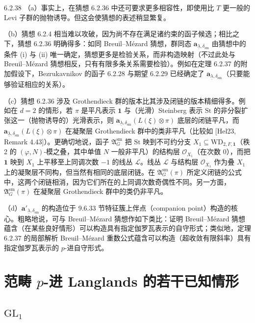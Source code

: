 \begin{rem}{6.2.38}\label{rem:a4-6-2-38}
（a）事实上，在猜想 6.2.36 中还可要求更多相容性，即使用比 $T$ 更一般的 Levi 子群的抛物诱导。但这会使猜想的表述稍显繁复。

（b）猜想 6.2.4 相当难以攻破，因为尚不存在满足诸约束的函子候选；相比之下，猜想 6.2.36 明确得多：如同 Breuil--Mézard 猜想，群同态 $\mathbf a_{\underline\lambda,\delta_{\mathrm{sm}}}$ 由猜想中的条件 (i) 与 (ii) 唯一确定，猜想更多是检验关系，而非构造映射（不过此处与 Breuil--Mézard 猜想相反，只有有限多条关系需要检验）。例如在定理 6.2.37 的附加假设下，Bezrukavnikov 的函子 6.2.28 与期望 6.2.29 已经确定了 $\mathbf a_{\underline\lambda,\delta_{\mathrm{sm}}}$（只要能够验证相应的关系）。

（c）猜想 6.2.36 涉及 Grothendieck 群的版本比其涉及闭链的版本精细得多。例如在 $d=2$ 的情形，若 $\pi$ 是平凡表示 $\mathbf 1$ 与（光滑）Steinberg 表示 $\mathrm{St}$ 的非分裂扩张这一（抛物诱导的）光滑表示，则 $\mathbf a_{\underline\lambda,\delta_{\mathrm{sm}}}(L(\xi)\otimes\pi)$ 底层的闭链平凡，而 $\mathbf a_{\underline\lambda,\delta_{\mathrm{sm}}}(L(\xi)\otimes\pi)$ 在凝聚层 Grothendieck 群中的类非平凡（比较如 [Hel23, Remark 4.43]）。更确切地说，函子 $\mathfrak A_G^{\mathrm{sm}}$ 把 $\mathrm{St}$ 映到不可约分支 $X_1\subseteq\mathrm{WD}_{2,F,\mathbf 1}$（秩 2 的 $(\varphi,N)$-模之叠，其中单值 $N$ 一般非平凡）的结构层 $\mathcal O_{X_1}$（在次数 0），而把 $\mathbf 1$ 映到 $X_1$ 上平移至上同调次数 $-1$ 的线丛 $\mathcal L$。线丛 $\mathcal L$ 与结构层 $\mathcal O_{X_1}$ 作为叠 $X_1$ 上的凝聚层不同构，但当然有相同的底层闭链。在 $\mathfrak A_G^{\mathrm{sm}}(\pi)$ 所定义闭链的公式中，这两个闭链相消，因为它们所在的上同调次数奇偶性不同。另一方面，$\mathfrak A_G^{\mathrm{sm}}(\pi)$ 在凝聚层 Grothendieck 群中的类仍非平凡。

（d）$\mathbf a'_{\underline\lambda,\delta_{\mathrm{sm}}}$ 的构造位于 9.6.33 节特征簇上伴点（companion point）构造的核心。粗略地说，可与 Breuil--Mézard 猜想作如下类比：证明 Breuil--Mézard 猜想蕴含（在某些良好情形）可以构造具有指定伽罗瓦表示的自守形式；类似地，定理 6.2.37 的局部解析 Breuil--Mézard 重数公式蕴含可以构造（超收敛有限斜率）具有指定伽罗瓦表示的 $p$-进自守形式。
\end{rem}

\section{范畴 $p$-进 Langlands 的若干已知情形}

\subsection{$\mathrm{GL}_1$}

